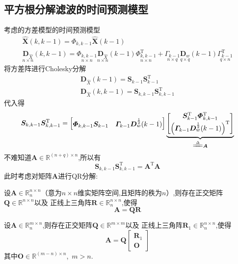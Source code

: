 \documentclass[cn,10pt,citestyle=gb7714-2015,bibstyle=gb7714-2015]{elegantbook}
\newcommand{\mT}{\mathrm{T}}
\begin{document}
\subsection{平方根分解滤波的时间预测模型}
考虑的方差模型的时间预测模型
\begin{gather}
  \hat{\bm{X}}(k,k-1)=\bm{\varPhi}_{k,k-1}\hat{\bm{X}}(k-1)\\
  \underset{n\times n}{\bm{D}_{\hat{X}}}(k,k-1)=\underset{n\times n}{\bm{\varPhi}_{k,k-1}}\underset{n\times n}{\bm{D}_{\hat{X}}}(k-1)\underset{n\times n}{\bm{\varPhi}_{k,k-1}^\mT}+\underset{n\times q}{\bm{\varGamma}_{k-1}}\underset{q\times q}{\bm{D}_w}(k-1)\underset{q\times n}{\bm{\varGamma}_{k-1}^\mT}
\end{gather}
将方差阵进行Cholesky分解
\begin{gather}
  \bm{D}_{\hat{X}}(k-1)=\bm{S}_{k-1}\bm{S}_{k-1}^\mT\label{eq:variance-update-Cholesky}\\
  \bm{D}_{\hat{X}}(k,k-1)=\bm{S}_{k,k-1}\bm{S}_{k,k-1}^\mT\label{eq:variance-predict-Cholesky}
\end{gather}
代入得
\begin{equation}
  \bm{S}_{k,k-1}\bm{S}_{k,k-1}^\mT=\begin{bmatrix}
    \bm{\varPhi}_{k,k-1}\bm{S}_{k-1}&\bm{\varGamma}_{k-1}\bm{D}_w^{\frac12}(k-1)
  \end{bmatrix}\underbrace{\begin{bmatrix}
    \bm{S}_{k-1}^\mT\bm{\varPhi}_{k,k-1}^\mT\\
    \left(\bm{\varGamma}_{k-1}\bm{D}_w^{\frac12}(k-1)\right)^\mT
  \end{bmatrix}}_{\xlongequal{\Delta}\bm{A}}
\end{equation}
不难知道$\bm{A}\in\mathbb{R}^{(n+q)\times n}$,所以有
\[
  \bm{S}_{k,k-1}\bm{S}_{k,k-1}^\mT=\bm{A}^\mT\bm{A}
\]
此时考虑对矩阵$\bm{A}$进行QR分解:
\begin{theorem}[方阵的QR分解]\label{thm:matrix-QR}
  设$\bm{A}\in\mathbb{R}^{n\times n}_n$（意为$n\times n$维实矩阵空间,且矩阵的秩为$n$）,则存在正交矩阵$\bm{Q}\in\mathbb{R}^{n\times n}$以及
  正线上三角阵$\bm{R}\in\mathbb{R}^{n\times n}_n$,使得
  \begin{equation}
    \bm{A}=\bm{Q}\bm{R}
  \end{equation}
\end{theorem}
\begin{corollary}[长矩阵的QR分解]\label{cor:long-matrix-QR}
  设$\bm{A}\in\mathbb{R}_{n}^{m\times n}$,则存在正交矩阵$\bm{Q}\in\mathbb{R}^{m\times m}$以及
  正线上三角阵$\bm{R}_1\in\mathbb{R}_n^{n\times n}$,使得
  \begin{equation}
    \bm{A}=\bm{Q}\begin{bmatrix}
      \bm{R}_1\\
      \bm{O}
    \end{bmatrix}
  \end{equation}
  其中$\bm{O}\in\mathbb{R}^{(m-n)\times n}$,\ $m>n$.
\end{corollary}
\end{document}
